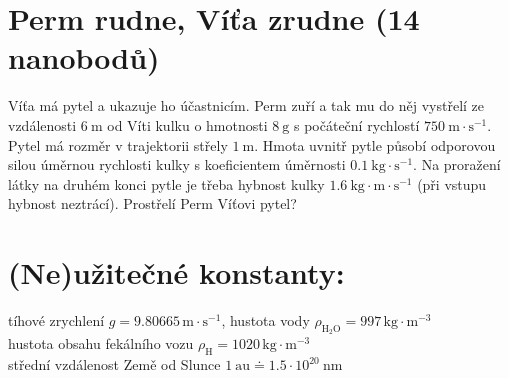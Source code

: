 \documentclass[10pt,a4paper,landscape]{article}
\begin{document}
\begin{multicols}{2}[]
\section{Perm rudne, Víťa zrudne (14 nanobodů)}
Víťa má pytel a ukazuje ho účastnicím. Perm zuří a tak mu do něj vystřelí ze vzdálenosti $6~\mathrm{m}$ od Víti kulku o hmotnosti $8~\mathrm{g}$ s počáteční rychlostí $750~\mathrm{m}\cdot\mathrm{s}^{-1}$. Pytel má rozměr v trajektorii střely $1~\mathrm{m}$. Hmota uvnitř pytle působí odporovou silou úměrnou rychlosti kulky s koeficientem úměrnosti $0.1~\mathrm{kg}\cdot\mathrm{s}^{-1}$. Na proražení látky na druhém konci pytle je třeba hybnost kulky $1.6~\mathrm{kg}\cdot\mathrm{m}\cdot\mathrm{s}^{-1}$ (při vstupu hybnost neztrácí). Prostřelí Perm Víťovi pytel?

\section*{(Ne)užitečné konstanty:}
tíhové zrychlení $g = 9.80665\,\mathrm{m}\cdot\mathrm{s}^{-1}$, hustota vody $\rho_{\mathrm{H}_2\mathrm{O}} = 997\,\mathrm{kg}\cdot\mathrm{m}^{-3}$\\
hustota obsahu fekálního vozu $\rho_{\mathrm{H}} = 1020\,\mathrm{kg}\cdot\mathrm{m}^{-3}$\\
střední vzdálenost Země od Slunce $1~\mathrm{au} \doteq 1.5\cdot 10^{20}~\mathrm{nm}$

\end{multicols}
\end{document}
